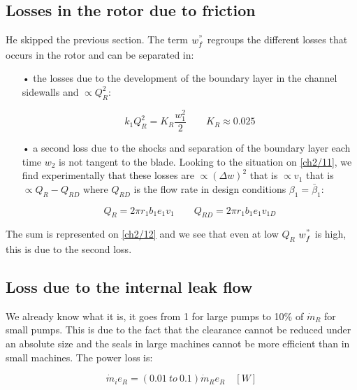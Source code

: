 \subsection{Losses in the rotor due to friction}
He skipped the previous section. The term $w^"_f$ regroups the different losses that occurs in the rotor and can be separated in:\\ 

\begin{itemize}
\item[•] the losses due to the development of the boundary layer in the channel sidewalls and $\propto Q_R^2$: 

\begin{equation}
k_1 Q_R^2 = K_R\frac{w_1^2}{2} \qquad K_R \approx 0.025
\end{equation}

\item[•] a second loss due to the shocks and separation of the boundary layer each time $w_2$ is not tangent to the blade. Looking to the situation on \autoref{ch2/11}, we find experimentally that these losses are $\propto (\Delta w)^2$ that is $\propto v_1$ that is $\propto Q_R - Q_{RD}$ where $Q_{RD}$ is the flow rate in design conditions $\beta _1 = \bar{\beta} _1$: 

\begin{equation}
Q_R = 2\pi r_1 b_1 e_1 v_1 \qquad Q_{RD} = 2\pi r_1 b_1 e_1 v_{1D}
\end{equation}  
\end{itemize}


The sum is represented on \autoref{ch2/12} and we see that even at low $Q_R$ $w^"_f$ is high, this is due to the second loss. 

\subsection{Loss due to the internal leak flow}
We already know what it is, it goes from 1 for large pumps to 10\% of $\dot{m}_R$ for small pumps. This is due to the fact that the clearance cannot be reduced under an absolute size and the seals in large machines cannot be more efficient than in small machines. The power loss is: 

\begin{equation}
\dot{m}_i e_R = (0.01\ to\ 0.1)\dot{m}_Re_R \quad [W]
\end{equation}


